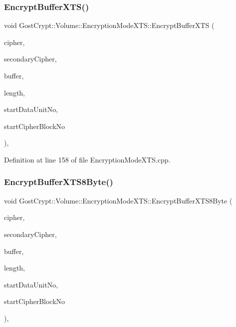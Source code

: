 \subsubsection{\texorpdfstring{Encrypt\+Buffer\+X\+T\+S()}{EncryptBufferXTS()}}
{\footnotesize\ttfamily void Gost\+Crypt\+::\+Volume\+::\+Encryption\+Mode\+X\+T\+S\+::\+Encrypt\+Buffer\+X\+TS (\begin{DoxyParamCaption}\item[{const \hyperlink{class_gost_crypt_1_1_volume_1_1_cipher_algorithm}{Cipher\+Algorithm} \&}]{cipher,  }\item[{const \hyperlink{class_gost_crypt_1_1_volume_1_1_cipher_algorithm}{Cipher\+Algorithm} \&}]{secondary\+Cipher,  }\item[{quint8 $\ast$}]{buffer,  }\item[{quint64}]{length,  }\item[{quint64}]{start\+Data\+Unit\+No,  }\item[{unsigned int}]{start\+Cipher\+Block\+No }\end{DoxyParamCaption})\hspace{0.3cm}{\ttfamily [static]}, {\ttfamily [protected]}}



Definition at line 158 of file Encryption\+Mode\+X\+T\+S.\+cpp.

\mbox{\label{class_gost_crypt_1_1_volume_1_1_encryption_mode_x_t_s_aa712631e9a2bb83e9322693a49b12183}} 
\subsubsection{\texorpdfstring{Encrypt\+Buffer\+X\+T\+S8\+Byte()}{EncryptBufferXTS8Byte()}}
{\footnotesize\ttfamily void Gost\+Crypt\+::\+Volume\+::\+Encryption\+Mode\+X\+T\+S\+::\+Encrypt\+Buffer\+X\+T\+S8\+Byte (\begin{DoxyParamCaption}\item[{const \hyperlink{class_gost_crypt_1_1_volume_1_1_cipher_algorithm}{Cipher\+Algorithm} \&}]{cipher,  }\item[{const \hyperlink{class_gost_crypt_1_1_volume_1_1_cipher_algorithm}{Cipher\+Algorithm} \&}]{secondary\+Cipher,  }\item[{quint8 $\ast$}]{buffer,  }\item[{quint64}]{length,  }\item[{quint64}]{start\+Data\+Unit\+No,  }\item[{unsigned int}]{start\+Cipher\+Block\+No }\end{DoxyParamCaption})\hspace{0.3cm}{\ttfamily [static]}, {\ttfamily [protected]}}



